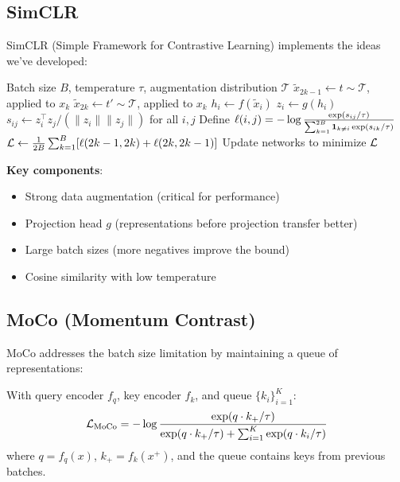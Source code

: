 \begin{notechapter}
\subsection{SimCLR}

SimCLR (Simple Framework for Contrastive Learning) implements the ideas we've developed:

\begin{algorithm}
\caption{SimCLR Training}
\begin{algorithmic}[1]
\Require Batch size $B$, temperature $\tau$, augmentation distribution $\mathcal{T}$
        \State $\tilde{x}_{2k-1} \gets t \sim \mathcal{T}$, applied to $x_k$ 
        \State $\tilde{x}_{2k} \gets t' \sim \mathcal{T}$, applied to $x_k$ 
    \EndFor
        \State $h_i \gets f(\tilde{x}_i)$ 
        \State $z_i \gets g(h_i)$ 
    \EndFor
    \State $s_{ij} \gets z_i^\top z_j / (\|z_i\| \|z_j\|)$ for all $i, j$ 
    \State Define $\ell(i, j) = -\log \frac{\exp(s_{ij}/\tau)}{\sum_{k=1}^{2B} \mathbf{1}_{k \neq i} \exp(s_{ik}/\tau)}$
    \State $\mathcal{L} \gets \frac{1}{2B} \sum_{k=1}^{B} [\ell(2k-1, 2k) + \ell(2k, 2k-1)]$
    \State Update networks to minimize $\mathcal{L}$
\EndFor
\end{algorithmic}
\end{algorithm}

\textbf{Key components}:
\begin{itemize}
    \item Strong data augmentation (critical for performance)
    \item Projection head $g$ (representations before projection transfer better)
    \item Large batch sizes (more negatives improve the bound)
    \item Cosine similarity with low temperature
\end{itemize}

\subsection{MoCo (Momentum Contrast)}

MoCo addresses the batch size limitation by maintaining a queue of representations:

\begin{definition}
With query encoder $f_q$, key encoder $f_k$, and queue $\{k_i\}_{i=1}^{K}$:
\begin{equation}
\mathcal{L}_{\text{MoCo}} = -\log \frac{\exp(q \cdot k_+ / \tau)}{\exp(q \cdot k_+ / \tau) + \sum_{i=1}^{K} \exp(q \cdot k_i / \tau)}
\end{equation}
where $q = f_q(x)$, $k_+ = f_k(x^+)$, and the queue contains keys from previous batches.
\end{definition}


\end{notechapter}
